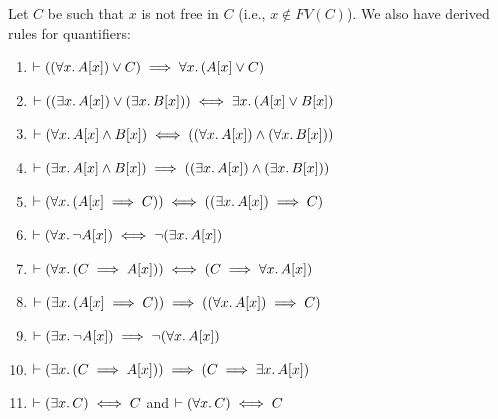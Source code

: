 \begin{node}\label{node:fs0:derived.nw:toc:predicate-logic}
Let $C$ be such that $x$ is not free in $C$ (i.e., $x\notin FV(C)$).
We also have derived rules for quantifiers:
\begin{enumerate}\setcounter{enumi}{\value{node}}
\item {} $\vdash((\forall x\ldotp A[x])\lor C)\implies\forall x\ldotp
(A[x]\lor C)$%
\item {} $\vdash((\exists x\ldotp A[x])\lor(\exists x\ldotp B[x]))\iff\exists x\ldotp(A[x]\lor B[x])$%
\item {} $\vdash(\forall x\ldotp A[x]\land B[x])\iff((\forall x\ldotp A[x])\land(\forall x\ldotp B[x]))$%
\item {} $\vdash(\exists x\ldotp A[x]\land B[x])\implies((\exists x\ldotp A[x])\land(\exists x\ldotp B[x]))$%
\item {} $\vdash(\forall x\ldotp(A[x]\implies C))\iff((\exists x\ldotp A[x])\implies C)$%
\item {} $\vdash(\forall x\ldotp\neg A[x])\iff\neg(\exists x\ldotp A[x])$%
\bigbreak
\item {} $\vdash(\forall x\ldotp(C\implies A[x]))\iff(C\implies\forall x\ldotp A[x])$%
\item {} $\vdash(\exists x\ldotp(A[x]\implies C))\implies((\forall x\ldotp A[x])\implies C)$%
\item {} $\vdash(\exists x\ldotp\neg A[x])\implies\neg(\forall x\ldotp A[x])$%
\item {} $\vdash(\exists x\ldotp(C\implies A[x]))\implies(C\implies\exists x\ldotp A[x])$%
\item {} $\vdash(\exists x\ldotp C)\iff C$ and $\vdash(\forall x\ldotp C)\iff C$
\end{enumerate}
\end{node}

\nwenddocs{}\endmoddef\nwstartdeflinemarkup{}\nwenddeflinemarkup

